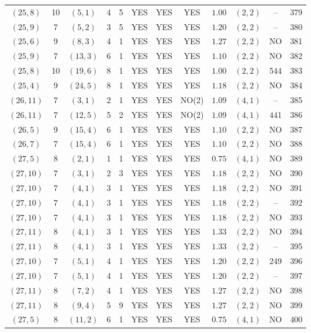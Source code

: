 \begin{longtable}{|c|c|c|c|c|c|c|c|c|c|c|c|}
$(25,8)$ & 10 & $(5,1)$ & 4 & 5 & YES & YES & YES & $1.00$ & $(2,2)$ & -- & 379\\
$(25,9)$ & 7 & $(5,2)$ & 3 & 5 & YES & YES & YES & $1.20$ & $(2,2)$ & -- & 380\\
$(25,6)$ & 9 & $(8,3)$ & 4 & 1 & YES & YES & YES & $1.27$ & $(2,2)$ & NO & 381\\
$(25,9)$ & 7 & $(13,3)$ & 6 & 1 & YES & YES & YES & $1.10$ & $(2,2)$ & NO & 382\\
$(25,8)$ & 10 & $(19,6)$ & 8 & 1 & YES & YES & YES & $1.00$ & $(2,2)$ & 544 & 383\\
$(25,4)$ & 9 & $(24,5)$ & 8 & 1 & YES & YES & YES & $1.18$ & $(2,2)$ & NO & 384\\
$(26,11)$ & 7 & $(3,1)$ & 2 & 1 & YES & YES & NO(2) & $1.09$ & $(4,1)$ & -- & 385\\
$(26,11)$ & 7 & $(12,5)$ & 5 & 2 & YES & YES & NO(2) & $1.09$ & $(4,1)$ & 441 & 386\\
$(26,5)$ & 9 & $(15,4)$ & 6 & 1 & YES & YES & YES & $1.10$ & $(2,2)$ & NO & 387\\
$(26,7)$ & 7 & $(15,4)$ & 6 & 1 & YES & YES & YES & $1.10$ & $(2,2)$ & NO & 388\\
$(27,5)$ & 8 & $(2,1)$ & 1 & 1 & YES & YES & YES & $0.75$ & $(4,1)$ & NO & 389\\
$(27,10)$ & 7 & $(3,1)$ & 2 & 3 & YES & YES & YES & $1.18$ & $(2,2)$ & NO & 390\\
$(27,10)$ & 7 & $(4,1)$ & 3 & 1 & YES & YES & YES & $1.18$ & $(2,2)$ & NO & 391\\
$(27,10)$ & 7 & $(4,1)$ & 3 & 1 & YES & YES & YES & $1.18$ & $(2,2)$ & -- & 392\\
$(27,10)$ & 7 & $(4,1)$ & 3 & 1 & YES & YES & YES & $1.18$ & $(2,2)$ & NO & 393\\
$(27,11)$ & 8 & $(4,1)$ & 3 & 1 & YES & YES & YES & $1.33$ & $(2,2)$ & NO & 394\\
$(27,11)$ & 8 & $(4,1)$ & 3 & 1 & YES & YES & YES & $1.33$ & $(2,2)$ & -- & 395\\
$(27,10)$ & 7 & $(5,1)$ & 4 & 1 & YES & YES & YES & $1.20$ & $(2,2)$ & 249 & 396\\
$(27,10)$ & 7 & $(5,1)$ & 4 & 1 & YES & YES & YES & $1.20$ & $(2,2)$ & -- & 397\\
$(27,11)$ & 8 & $(7,2)$ & 4 & 1 & YES & YES & YES & $1.27$ & $(2,2)$ & NO & 398\\
$(27,11)$ & 8 & $(9,4)$ & 5 & 9 & YES & YES & YES & $1.27$ & $(2,2)$ & NO & 399\\
$(27,5)$ & 8 & $(11,2)$ & 6 & 1 & YES & YES & YES & $0.75$ & $(4,1)$ & NO & 400\\

\end{longtable}
